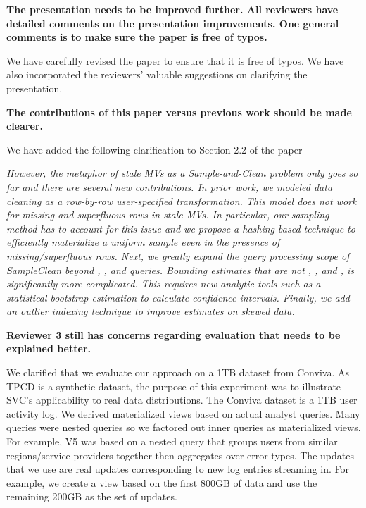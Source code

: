 \vspace{1.5em}

\textbf{The presentation needs to be improved further. All reviewers have detailed comments on the presentation improvements. One general comments is to make sure the paper is free of typos.}

We have carefully revised the paper to ensure that it is free of typos. We have also incorporated the reviewers' valuable suggestions on clarifying the presentation.

\vspace{1.5em}

\textbf{The contributions of this paper versus previous work should be made clearer.}

We have added the following clarification to Section 2.2 of the paper

\emph{However, the metaphor of stale MVs as a Sample-and-Clean problem only goes so far and there are several new contributions. In prior work, we modeled data cleaning as a row-by-row user-specified transformation.
This model does not work for missing and superfluous rows in stale MVs. In particular, our sampling method has to account for this issue and we propose a hashing based technique to efficiently materialize a uniform sample even in the presence of missing/superfluous rows. Next, we greatly expand the query processing scope of SampleClean beyond \sumfunc, \countfunc, and \avgfunc queries. Bounding estimates that are not \sumfunc, \countfunc, and \avgfunc, is significantly more complicated. This requires new analytic tools such as a statistical bootstrap estimation to calculate confidence intervals. Finally, we add an outlier indexing technique to improve estimates on skewed data.}

\vspace{1.5em}

\textbf{Reviewer 3 still has concerns regarding evaluation that needs to be explained better.}

We clarified that we evaluate our approach on a 1TB dataset from Conviva. As TPCD is a synthetic dataset, the purpose of this experiment was to illustrate SVC’s applicability to real data distributions. The Conviva dataset is a 1TB user activity log. We derived materialized views based on actual analyst queries. Many queries were nested queries so we factored out inner queries as materialized views. For example, V5 was based on a nested query that groups users from similar regions/service providers together then aggregates over error types. The updates that we use are real updates corresponding to new log entries streaming in. For example, we create a view based on the first 800GB of data and use the remaining 200GB as the set of updates. 


